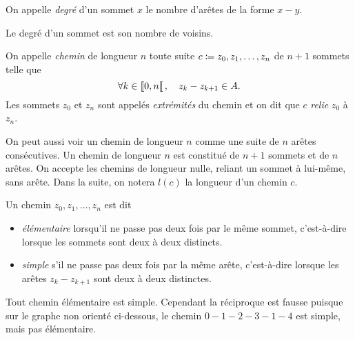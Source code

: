 \documentclass{magnolia}
\begin{document}
\begin{definition}
On appelle \emph{degré} d'un sommet $x$ le nombre d'arêtes de la forme $x-y$.
\end{definition}

\begin{remarqueUnique}
\remarque Le degré d'un sommet est son nombre de voisins.
\end{remarqueUnique}

\begin{definition}
On appelle \emph{chemin} de longueur $n$ toute suite $c\coloneqq z_0,z_1,\ldots,z_{n}$ de $n+1$ sommets telle que
\[\forall k\in\left\llbracket 0,n\right\llbracket,\quad z_k-z_{k+1}\in A.\]
Les sommets $z_0$ et $z_n$ sont appelés \emph{extrémités} du chemin et on dit que $c$
\emph{relie} $z_0$ à $z_n$. 
\end{definition}

\begin{remarques}
\remarque On peut aussi voir un chemin de longueur $n$ comme une suite de $n$ arêtes consécutives. Un chemin de longueur $n$ est constitué de $n+1$ sommets et de $n$ arêtes.
\remarque On accepte les chemins de longueur nulle, reliant un sommet à lui-même, sans arête.
\remarque Dans la suite, on notera $l(c)$ la longueur d'un chemin $c$.
\end{remarques}

\begin{definition}
Un chemin $z_0,z_1,\ldots,z_n$ est dit
\begin{itemize}
\item \emph{élémentaire} lorsqu'il ne passe pas deux fois par le même sommet, c'est-à-dire
  lorsque les sommets sont deux à deux distincts.
\item \emph{simple} s'il ne passe pas deux fois par la même arête, c'est-à-dire lorsque
  les arêtes $z_k - z_{k+1}$ sont deux à deux distinctes.
\end{itemize}
\end{definition}

\begin{remarqueUnique}
\remarque Tout chemin élémentaire est simple. Cependant la réciproque est fausse puisque
sur le graphe non orienté ci-dessous, le chemin $0-1-2-3-1-4$ est simple, mais pas
élémentaire.
\begin{center}
\end{center}
\end{remarqueUnique}
\end{document}
